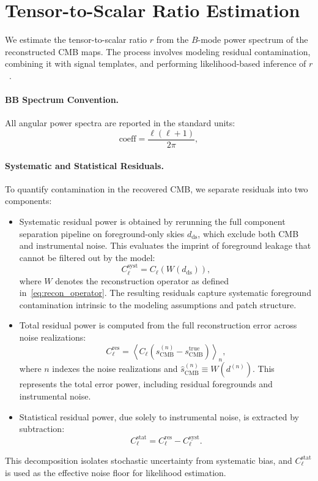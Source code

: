 \documentclass[%
 reprint,
bibnotes,
 amsmath,amssymb,
 aps,
floatfix, 
]{revtex4-2}
\begin{document}
\section{Tensor-to-Scalar Ratio Estimation}
\label{sec:r_estimation}

We estimate the tensor-to-scalar ratio \( r \) from the \( B \)-mode power spectrum of the reconstructed CMB maps. The process involves modeling residual contamination, combining it with signal templates, and performing likelihood-based inference of \( r \)~\citep{STOMPER16, ERRAR18}.

\paragraph{BB Spectrum Convention.}
All angular power spectra are reported in the standard units:
\[
\text{coeff} = \frac{\ell(\ell + 1)}{2\pi},
\]

\paragraph{Systematic and Statistical Residuals.}
To quantify contamination in the recovered CMB, we separate residuals into two components:
\begin{itemize}

    \item Systematic residual power is obtained by rerunning the full component separation pipeline on foreground-only skies \( d_{\mathrm{ds}} \), which exclude both CMB and instrumental noise. This evaluates the imprint of foreground leakage that cannot be filtered out by the model:
    \[
    C_\ell^{\mathrm{syst}} = C_\ell \left( W(d_{\mathrm{ds}}) \right),
    \]
    where \( W \) denotes the reconstruction operator as defined in~\eqref{eq:recon_operator}. The resulting residuals capture systematic foreground contamination intrinsic to the modeling assumptions and patch structure.

    \item Total residual power is computed from the full reconstruction error across noise realizations:
    \[
    C_\ell^{\mathrm{res}} = \left\langle C_\ell \left( \hat{s}_{\mathrm{CMB}}^{(n)} - s_{\mathrm{CMB}}^{\mathrm{true}} \right) \right\rangle_{n},
    \]
    where \( n \) indexes the noise realizations and \( \hat{s}_{\mathrm{CMB}}^{(n)} \equiv W(d^{(n)}) \).
    This represents the total error power, including residual foregrounds and instrumental noise.

    \item Statistical residual power, due solely to instrumental noise, is extracted by subtraction:
    \[
    C_\ell^{\mathrm{stat}} = C_\ell^{\mathrm{res}} - C_\ell^{\mathrm{syst}}.
    \]
\end{itemize}
This decomposition isolates stochastic uncertainty from systematic bias, and \( C_\ell^{\mathrm{stat}} \) is used as the effective noise floor for likelihood estimation.
\end{document}
